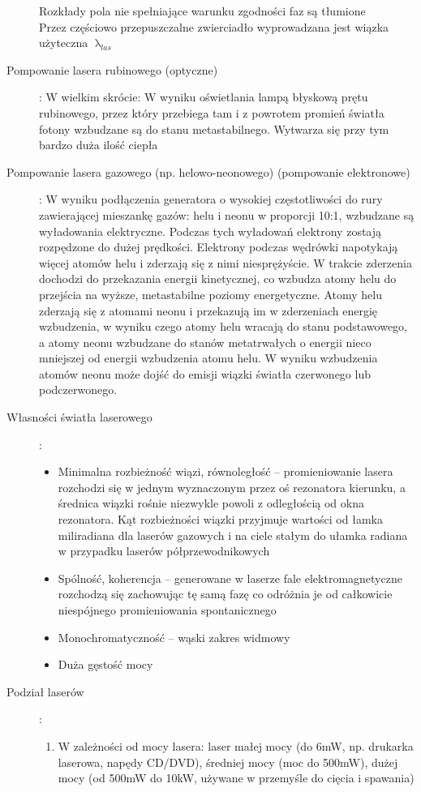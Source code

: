 \documentclass[a4paper,11pt]{article}
\begin{document}
\begin{description}
  Rozkłady pola nie spełniające warunku zgodności faz są tłumione\\
  Przez częściowo przepuszczalne zwierciadło wyprowadzana jest wiązka użyteczna $\uplambda_{las}$
\item[Pompowanie lasera rubinowego (optyczne)]: W wielkim skrócie: W wyniku oświetlania lampą błyskową prętu rubinowego, przez który przebiega tam i z powrotem promień światła fotony wzbudzane są do stanu metastabilnego. Wytwarza się przy tym bardzo duża ilość ciepła
\item[Pompowanie lasera gazowego (np. helowo-neonowego) (pompowanie elektronowe)]: W wyniku podłączenia generatora o wysokiej częstotliwości do rury zawierającej mieszankę gazów: helu i neonu w proporcji 10:1, wzbudzane są wyładowania elektryczne. Podczas tych wyładowań elektrony zostają rozpędzone do dużej prędkości. Elektrony podczas wędrówki napotykają więcej atomów helu i zderzają się z nimi niesprężyście. W trakcie zderzenia dochodzi do przekazania energii kinetycznej, co wzbudza atomy helu do przejścia na wyższe, metastabilne poziomy energetyczne. Atomy helu zderzają się z atomami neonu i przekazują im w zderzeniach energię wzbudzenia, w wyniku czego atomy helu wracają do stanu podstawowego, a atomy neonu wzbudzane do stanów metatrwałych o energii nieco mniejszej od energii wzbudzenia atomu helu. W wyniku wzbudzenia atomów neonu może dojść do emisji wiązki światła czerwonego lub podczerwonego.
\item[Własności światła laserowego]:
  \begin{itemize}
  \item Minimalna rozbieżność wiązi, równoległość -- promieniowanie lasera rozchodzi się w jednym wyznaczonym przez oś rezonatora kierunku, a średnica wiązki rośnie niezwykle powoli z odległością od okna rezonatora. Kąt rozbieżności wiązki przyjmuje wartości od łamka miliradiana dla laserów gazowych i na ciele stałym do ułamka radiana w przypadku laserów półprzewodnikowych
  \item Spólność, koherencja -- generowane w laserze fale elektromagnetyczne rozchodzą się zachowując tę samą fazę co odróżnia je od całkowicie niespójnego promieniowania spontanicznego
  \item Monochromatyczność -- wąski zakres widmowy
  \item Duża gęstość mocy
  \end{itemize}
\item[Podział laserów]:
  \begin{enumerate}
  \item W zależności od mocy lasera: laser małej mocy (do 6mW, np. drukarka laserowa, napędy CD/DVD), średniej mocy (moc do 500mW), dużej mocy (od 500mW do 10kW, używane w przemyśle do cięcia i spawania)

\end{enumerate}
\end{description}
\end{document}
